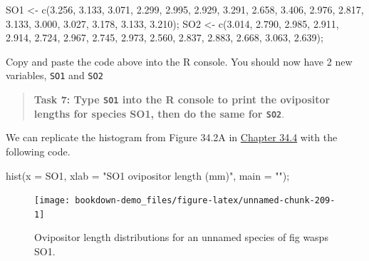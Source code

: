 \documentclass[
]{scrbook}
\newenvironment{Shaded}{\begin{snugshade}}{\end{snugshade}}
\newcommand{\AttributeTok}[1]{\textcolor[rgb]{0.77,0.63,0.00}{#1}}
\newcommand{\FloatTok}[1]{\textcolor[rgb]{0.00,0.00,0.81}{#1}}
\newcommand{\FunctionTok}[1]{\textcolor[rgb]{0.00,0.00,0.00}{#1}}
\newcommand{\NormalTok}[1]{#1}
\newcommand{\OtherTok}[1]{\textcolor[rgb]{0.56,0.35,0.01}{#1}}
\newcommand{\StringTok}[1]{\textcolor[rgb]{0.31,0.60,0.02}{#1}}
\begin{document}
\begin{Shaded}
\begin{Highlighting}[]
\NormalTok{SO1 }\OtherTok{\textless{}{-}} \FunctionTok{c}\NormalTok{(}\FloatTok{3.256}\NormalTok{, }\FloatTok{3.133}\NormalTok{, }\FloatTok{3.071}\NormalTok{, }\FloatTok{2.299}\NormalTok{, }\FloatTok{2.995}\NormalTok{, }\FloatTok{2.929}\NormalTok{, }\FloatTok{3.291}\NormalTok{, }\FloatTok{2.658}\NormalTok{, }\FloatTok{3.406}\NormalTok{, }
         \FloatTok{2.976}\NormalTok{, }\FloatTok{2.817}\NormalTok{, }\FloatTok{3.133}\NormalTok{, }\FloatTok{3.000}\NormalTok{, }\FloatTok{3.027}\NormalTok{, }\FloatTok{3.178}\NormalTok{, }\FloatTok{3.133}\NormalTok{, }\FloatTok{3.210}\NormalTok{);}
\NormalTok{SO2 }\OtherTok{\textless{}{-}} \FunctionTok{c}\NormalTok{(}\FloatTok{3.014}\NormalTok{, }\FloatTok{2.790}\NormalTok{, }\FloatTok{2.985}\NormalTok{, }\FloatTok{2.911}\NormalTok{, }\FloatTok{2.914}\NormalTok{, }\FloatTok{2.724}\NormalTok{, }\FloatTok{2.967}\NormalTok{, }\FloatTok{2.745}\NormalTok{, }\FloatTok{2.973}\NormalTok{, }
         \FloatTok{2.560}\NormalTok{, }\FloatTok{2.837}\NormalTok{, }\FloatTok{2.883}\NormalTok{, }\FloatTok{2.668}\NormalTok{, }\FloatTok{3.063}\NormalTok{, }\FloatTok{2.639}\NormalTok{);}
\end{Highlighting}
\end{Shaded}

Copy and paste the code above into the R console.
You should now have 2 new variables, \texttt{SO1} and \texttt{SO2}

\begin{quote}
\textbf{Task 7: Type \texttt{SO1} into the R console to print the ovipositor lengths for species SO1, then do the same for \texttt{SO2}}.
\end{quote}

We can replicate the histogram from Figure 34.2A in \protect\hyperlink{randomisation-for-hypothesis-testing}{Chapter 34.4} with the following code.

\begin{Shaded}
\begin{Highlighting}[]
\FunctionTok{hist}\NormalTok{(}\AttributeTok{x =}\NormalTok{ SO1, }\AttributeTok{xlab =} \StringTok{"SO1 ovipositor length (mm)"}\NormalTok{, }\AttributeTok{main =} \StringTok{""}\NormalTok{);}
\end{Highlighting}
\end{Shaded}

\begin{figure}
\texttt{[image: bookdown-demo\_files/figure-latex/unnamed-chunk-209-1]} \caption{Ovipositor length distributions for an unnamed species of fig wasps SO1.}\label{fig:unnamed-chunk-209}
\end{figure}
\end{document}
